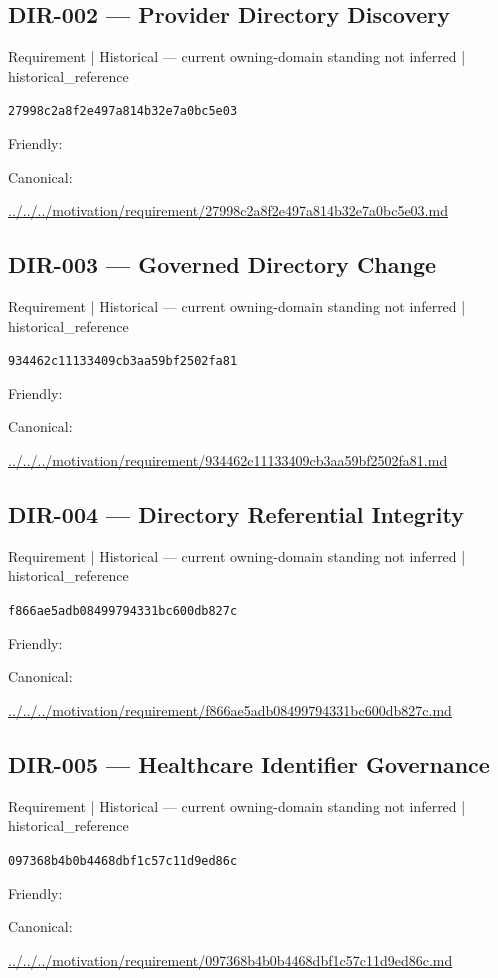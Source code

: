 \documentclass[10pt,a4paper]{article}
\begin{document}
\subsection*{DIR-002 — Provider Directory Discovery}
{\small Requirement | Historical — current owning-domain standing not inferred | historical\_reference}\par
\texttt{27998c2a8f2e497a814b32e7a0bc5e03}\par
Friendly: \par
Canonical: \par
{\footnotesize\url{../../../motivation/requirement/27998c2a8f2e497a814b32e7a0bc5e03.md}}\par
\subsection*{DIR-003 — Governed Directory Change}
{\small Requirement | Historical — current owning-domain standing not inferred | historical\_reference}\par
\texttt{934462c11133409cb3aa59bf2502fa81}\par
Friendly: \par
Canonical: \par
{\footnotesize\url{../../../motivation/requirement/934462c11133409cb3aa59bf2502fa81.md}}\par
\subsection*{DIR-004 — Directory Referential Integrity}
{\small Requirement | Historical — current owning-domain standing not inferred | historical\_reference}\par
\texttt{f866ae5adb08499794331bc600db827c}\par
Friendly: \par
Canonical: \par
{\footnotesize\url{../../../motivation/requirement/f866ae5adb08499794331bc600db827c.md}}\par
\subsection*{DIR-005 — Healthcare Identifier Governance}
{\small Requirement | Historical — current owning-domain standing not inferred | historical\_reference}\par
\texttt{097368b4b0b4468dbf1c57c11d9ed86c}\par
Friendly: \par
Canonical: \par
{\footnotesize\url{../../../motivation/requirement/097368b4b0b4468dbf1c57c11d9ed86c.md}}\par
\end{document}
